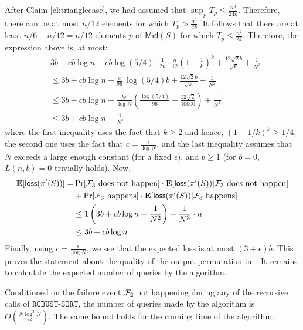\documentclass[11pt]{llncs}
\newcommand{\Mid}{{\mathsf{Mid}}}
\newcommand{\E}{\mathbf{E}}
\newcommand{\loss}{{\textsf{loss}}}
\newcommand{\RS}{{\texttt{ROBUST-SORT}}}
\begin{document}
    
After Claim \ref{cl:trianglecase}, we had assumed that $\sup_p T_p \leq \frac{n^3}{24 k}$. Therefore, there can be at most $n/12$ elements for which $T_p > \frac{n^2}{2k}$. It follows that there are at least $n/6 - n/12 = n/12$ elements $p$ of $\Mid(S)$ for which $T_p \leq \frac{n^2}{2k}$. Therefore, the expression above is, at most: 
\begin{align*}
    & 3b + cb \log n  - cb \log (5/4) \cdot \frac{1}{2n} \cdot \frac{n}{12} \left( 1 - \frac{1}{k} \right)^k  + \frac{12 \sqrt{2} b}{\sqrt{k}} + \frac{1}{N^2} \\
    & \leq 3b + cb \log n - \frac{c}{96} \, \log(5/4) b + \frac{12 \sqrt{2} b}{\sqrt{k}} + \frac{1}{N^2}\\
    & \leq 3b + cb \log n - \frac{b \epsilon}{\log N} \left( \frac{\log(5/4)}{96} - \frac{12 \sqrt{2}}{10000}\right) + \frac{1}{N^2}\\
    & \leq 3b + cb \log n - \frac{1}{N^2}
\end{align*}
where the first inequality uses the fact that $k \geq 2$ and hence, $(1-1/k)^k \geq 1/4$, the second one uses the fact that  $c = \frac{\epsilon}{\log N}$, and the last inequality assumes that $N$ exceeds a large enough constant (for a fixed $\epsilon$), and $b \geq 1$ (for $b = 0$, $L(n, b) = 0$ trivially holds). 
Now, 
\begin{align*}
    \E[\loss(\pi'(S))] = &\Pr[{\cal F}_3 \text{ does not happen}] \cdot \E[\loss(\pi'(S)) | {\cal F}_3 \text{ does not happen}]\\
    & + \Pr[{\cal F}_3 \text{ happens}] \cdot \E[\loss(\pi'(S)) | {\cal F}_3 \text{ happens}] \\
    & \leq 1 \left(3b + cb \log n - \frac{1}{N^2} \right) + \frac{1}{N^3} \cdot n\\
    & \leq 3b  + cb \log n
\end{align*}
Finally, using $c = \frac{\epsilon}{\log N}$, we see that the expected loss is at most $(3+\epsilon)b$. 
This proves the statement about the quality of the output permutation in~. It remains to calculate the expected number of queries by the algorithm. 
\begin{lemma}
    \label{lem:countqueries}
    Conditioned on the failure event ${\cal F}_2$ not happening during any of the recursive calls of $\RS$, the number of queries made by the algorithm is $O\left(\frac{N \log^3 N}{\epsilon^2}\right)$. The same bound holds for the running time of the algorithm. 
\end{lemma}
\end{document}
